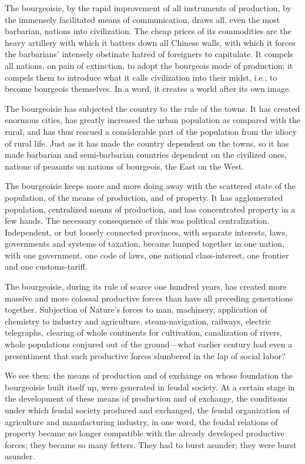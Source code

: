 The bourgeoisie, by the rapid improvement of all instruments of production, by the immensely facilitated means of communication, draws all, even the most barbarian, nations into civilization. The cheap prices of its commodities are the heavy artillery with which it batters down all Chinese walls, with which it forces the barbarians' intensely obstinate hatred of foreigners to capitulate. It compels all nations, on pain of extinction, to adopt the bourgeois mode of production; it compels them to introduce what it calls civilization into their midst, i.e., to become bourgeois themselves. In a word, it creates a world after its own image.

The bourgeoisie has subjected the country to the rule of the towns. It has created enormous cities, has greatly increased the urban population as compared with the rural, and has thus rescued a considerable part of the population from the idiocy of rural life. Just as it has made the country dependent on the towns, so it has made barbarian and semi-barbarian countries dependent on the civilized ones, nations of peasants on nations of bourgeois, the East on the West.

The bourgeoisie keeps more and more doing away with the scattered state of the population, of the means of production, and of property. It has agglomerated population, centralized means of production, and has concentrated property in a few hands. The necessary consequence of this was political centralization. Independent, or but loosely connected provinces, with separate interests, laws, governments and systems of taxation, became lumped together in one nation, with one government, one code of laws, one national class-interest, one frontier and one customs-tariff.

The bourgeoisie, during its rule of scarce one hundred years, has created more massive and more colossal productive forces than have all preceding generations together. Subjection of Nature's forces to man, machinery, application of chemistry to industry and agriculture, steam-navigation, railways, electric telegraphs, clearing of whole continents for cultivation, canalization of rivers, whole populations conjured out of the ground—what earlier century had even a presentiment that such productive forces slumbered in the lap of social labor?

We see then: the means of production and of exchange on whose foundation the bourgeoisie built itself up, were generated in feudal society. At a certain stage in the development of these means of production and of exchange, the conditions under which feudal society produced and exchanged, the feudal organization of agriculture and manufacturing industry, in one word, the feudal relations of property became no longer compatible with the already developed productive forces; they became so many fetters. They had to burst asunder; they were burst asunder.

